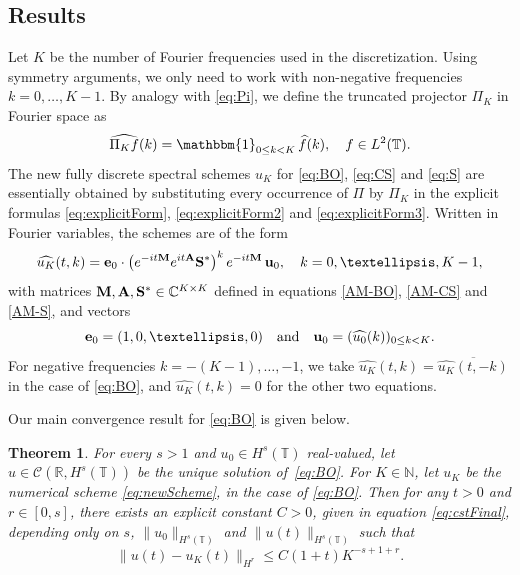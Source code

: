 \documentclass [11pt] {article}
\newtheorem{thm}{Theorem}[section]
\begin{document}
\subsection{Results}
\label{sec:results}
Let $K$ be the number of Fourier frequencies used in the discretization. Using symmetry arguments, we only need to work with non-negative frequencies $k = 0, \dots, K-1$. By analogy with \eqref{eq:Pi}, we define the truncated projector $\Pi_K$ in Fourier space as
\[
\widehat{\Pi_K f}(k) = \mathbbm{1}_{0\le k<K} \, \widehat{f}(k), \quad f\in L^2(\mathbb T).
\]
The new fully discrete spectral schemes $u_K$ for \eqref{eq:BO}, \eqref{eq:CS} and \eqref{eq:S} are essentially obtained by substituting every occurrence of $\Pi$ by $\Pi_K$  in the explicit formulas \eqref{eq:explicitForm}, \eqref{eq:explicitForm2} and \eqref{eq:explicitForm3}. Written in Fourier variables, the schemes are of the form
\begin{equation}
\label{eq:newScheme}
\smallskip
\widehat{u_K}(t, k) = {\bf e}_0\cdot \left(e^{-it{\bf M}}e^{it{\bf A}}{\bf S}^*\right)^k e^{-it{\bf M}}\,{\bf u}_0, \quad k = 0, \dots, K-1,
\end{equation}
with matrices ${\bf M,A, S^*}\in \mathbb C^{K\times K}$ defined in equations \eqref{AM-BO}, \eqref{AM-CS} and \eqref{AM-S}, and vectors 
\[
{\bf e}_0=(1,0,\dots,0)\quad\text{and}\quad {\bf u}_0 =(\widehat{u_0}(k))_{0\leq k < K}.
\]
For negative frequencies $k = -(K-1), \dots, -1$, we take
$\widehat{u_K}(t, k) = \overline{\widehat{u_K}(t, -k)}$ in the case of \eqref{eq:BO}, and $\widehat{u_K}(t, k) =0$ for the other two equations.


Our main convergence result for \eqref{eq:BO} is given below.
\begin{thm}\label{thm:main}
For every $s>1$ and $u_0 \in H^s(\mathbb{T})$ real-valued, let $u \in \mathcal{C}(\mathbb{R}, H^s(\mathbb{T}))$ be the unique solution of~\eqref{eq:BO}. For $K\in \mathbb N$, let $u_{K}$ be the numerical scheme \eqref{eq:newScheme}, in the case of \eqref{eq:BO}. Then for any $t>0$ and $r \in [0, s] $, there exists an explicit constant $C>0$, given in equation \eqref{eq:cstFinal}, depending only on $s$, $\|u_0\|_{H^s(\mathbb{T})}$ and $\|u(t)\|_{H^s(\mathbb{T})}$ such that 
\begin{equation}
\label{eq:cv}
\|u(t) - u_{K}(t)\|_{H^r} \leq C(1+t)K^{-s+1+r}.
\end{equation}
\end{thm}
\end{document}

